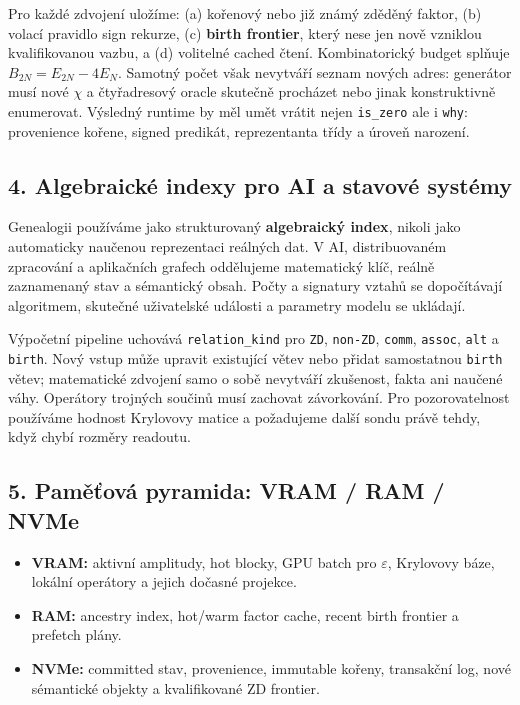 \documentclass[
  10pt,
]{article}
\providecommand{\tightlist}{%
  \setlength{\itemsep}{0pt}\setlength{\parskip}{0pt}}
\begin{document}
Pro každé zdvojení uložíme: (a) kořenový nebo již známý zděděný faktor,
(b) volací pravidlo sign rekurze, (c) \textbf{birth frontier}, který
nese jen nově vzniklou kvalifikovanou vazbu, a (d) volitelné cached
čtení. Kombinatorický budget splňuje \(B_{2N}=E_{2N}-4E_N\). Samotný
počet však nevytváří seznam nových adres: generátor musí nové \(\chi\) a
čtyřadresový oracle skutečně procházet nebo jinak konstruktivně
enumerovat. Výsledný runtime by měl umět vrátit nejen \texttt{is\_zero}
ale i \texttt{why}: provenience kořene, signed predikát, reprezentanta
třídy a úroveň narození.

\subsection{4. Algebraické indexy pro AI a stavové
systémy}\label{algebraickuxe9-indexy-pro-ai-a-stavovuxe9-systuxe9my}

Genealogii používáme jako strukturovaný \textbf{algebraický index},
nikoli jako automaticky naučenou reprezentaci reálných dat. V AI,
distribuovaném zpracování a aplikačních grafech oddělujeme matematický
klíč, reálně zaznamenaný stav a sémantický obsah. Počty a signatury
vztahů se dopočítávají algoritmem, skutečné uživatelské události a
parametry modelu se ukládají.

Výpočetní pipeline uchovává \texttt{relation\_kind} pro \texttt{ZD},
\texttt{non-ZD}, \texttt{comm}, \texttt{assoc}, \texttt{alt} a
\texttt{birth}. Nový vstup může upravit existující větev nebo přidat
samostatnou \texttt{birth} větev; matematické zdvojení samo o sobě
nevytváří zkušenost, fakta ani naučené váhy. Operátory trojných součinů
musí zachovat závorkování. Pro pozorovatelnost používáme hodnost
Krylovovy matice a požadujeme další sondu právě tehdy, když chybí
rozměry readoutu.

\subsection{5. Paměťová pyramida: VRAM / RAM /
NVMe}\label{pamux11bux165ovuxe1-pyramida-vram-ram-nvme}

\begin{itemize}
\tightlist
\item
  \textbf{VRAM:} aktivní amplitudy, hot blocky, GPU batch pro
  \(\varepsilon\), Krylovovy báze, lokální operátory a jejich dočasné
  projekce.
\item
  \textbf{RAM:} ancestry index, hot/warm factor cache, recent birth
  frontier a prefetch plány.
\item
  \textbf{NVMe:} committed stav, provenience, immutable kořeny,
  transakční log, nové sémantické objekty a kvalifikované ZD frontier.
\end{itemize}
\end{document}
